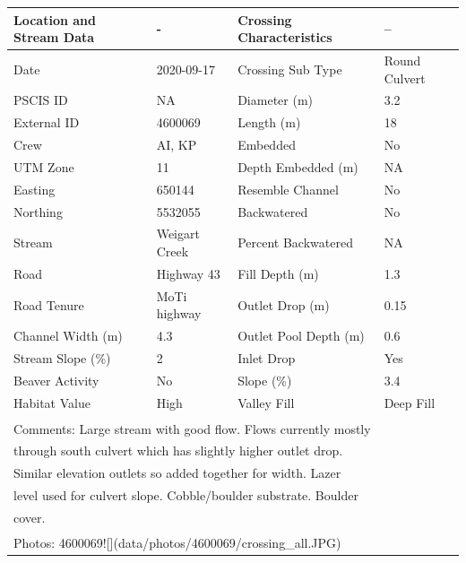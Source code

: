 \documentclass[
]{book}
\begin{document}
\begin{tabular}{l|l|l|l}
\hline
Location and Stream Data & - & Crossing Characteristics & --\\
\hline
Date & 2020-09-17 & Crossing Sub Type & Round Culvert\\
\hline
PSCIS ID & NA & Diameter (m) & 3.2\\
\hline
External ID & 4600069 & Length (m) & 18\\
\hline
Crew & AI, KP & Embedded & No\\
\hline
UTM Zone & 11 & Depth Embedded (m) & NA\\
\hline
Easting & 650144 & Resemble Channel & No\\
\hline
Northing & 5532055 & Backwatered & No\\
\hline
Stream & Weigart Creek & Percent Backwatered & NA\\
\hline
Road & Highway 43 & Fill Depth (m) & 1.3\\
\hline
Road Tenure & MoTi highway & Outlet Drop (m) & 0.15\\
\hline
Channel Width (m) & 4.3 & Outlet Pool Depth (m) & 0.6\\
\hline
Stream Slope (\%) & 2 & Inlet Drop & Yes\\
\hline
Beaver Activity & No & Slope (\%) & 3.4\\
\hline
Habitat Value & High & Valley Fill & Deep Fill\\
\hline
\multicolumn{4}{l}{\textsuperscript{} Comments: Large stream with good flow. Flows currently mostly}\\
\multicolumn{4}{l}{through south culvert which has slightly higher outlet drop.}\\
\multicolumn{4}{l}{Similar elevation outlets so added together for width. Lazer}\\
\multicolumn{4}{l}{level used for culvert slope. Cobble/boulder substrate. Boulder}\\
\multicolumn{4}{l}{cover.}\\
\multicolumn{4}{l}{\textsuperscript{} Photos: 4600069![](data/photos/4600069/crossing\_all.JPG)}\\
\end{tabular}
\end{document}

